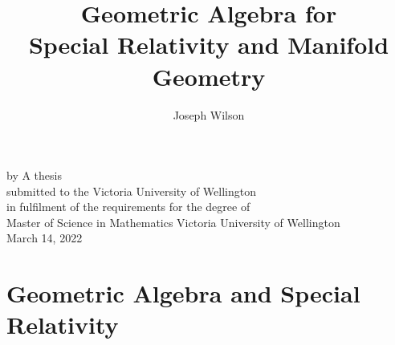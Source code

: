 \newif\ifdebug
\newif\iffinal
\finaltrue


% 

\setlength{\parskip}{1em}

\title{Geometric Algebra for \\ Special Relativity and Manifold Geometry}
\author{Joseph Wilson}

\makeatletter
\renewcommand\maketitle{
	\begin{center}
		\null\vfill
		{\huge\bfseries\sffamily \@title}
		\vfill
		by
		\vfill
		\@author
		\vfill
		A thesis \\
		submitted to the Victoria University of Wellington \\
		in fulfilment of the requirements for the degree of \\
		Master of Science in Mathematics
		\vfill
		Victoria University of Wellington \\
		March 14, 2022
		\vfill
	\end{center}
}
\makeatother




\frontmatter
{} %

	\maketitle
	\thispagestyle{empty}

	
	
	\tableofcontents

\restoregeometry %

\ifdebug
	
\fi

\mainmatter


\part{Geometric Algebra and Special Relativity}
\label{part:1}











